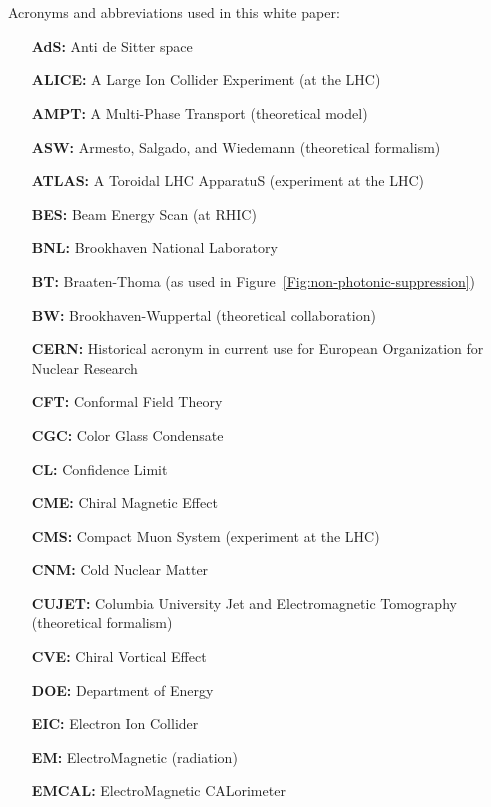 \section*{}
\label{Sec:AandA}

Acronyms and abbreviations used in this white paper:
\begin{itemize}

\item[\bf AdS:] Anti de Sitter space
\item[\bf ALICE:] A Large Ion Collider Experiment (at the LHC)
\item[\bf AMPT:] A Multi-Phase Transport (theoretical model)
\item[\bf ASW:] Armesto, Salgado, and Wiedemann (theoretical formalism)
\item[\bf ATLAS:] A Toroidal LHC ApparatuS (experiment at the LHC)
\item[\bf BES:] Beam Energy Scan (at RHIC)
\item[\bf BNL:] Brookhaven National Laboratory
\item[\bf BT:] Braaten-Thoma (as used in Figure~\ref{Fig:non-photonic-suppression})
\item[\bf BW:] Brookhaven-Wuppertal (theoretical collaboration)
\item[\bf CERN:] Historical acronym in current use for European Organization for Nuclear Research
\item[\bf CFT:] Conformal Field Theory
\item[\bf CGC:] Color Glass Condensate
\item[\bf CL:] Confidence Limit
\item[\bf CME:] Chiral Magnetic Effect
\item[\bf CMS:] Compact Muon System (experiment at the LHC)
\item[\bf CNM:] Cold Nuclear Matter
\item[\bf CUJET:] Columbia University Jet and Electromagnetic Tomography (theoretical formalism)
\item[\bf CVE:] Chiral Vortical Effect
\item[\bf DOE:] Department of Energy
\item[\bf EIC:] Electron Ion Collider
\item[\bf EM:] ElectroMagnetic (radiation)
\item[\bf EMCAL:] ElectroMagnetic CALorimeter

\end{itemize}
